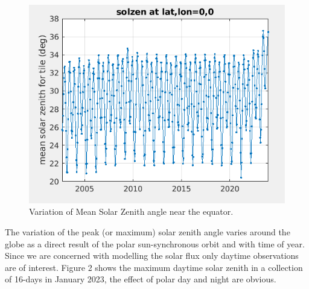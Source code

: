 \documentclass[11pt,twocolumn]{article}
\begin{document}
\begin{figure}[htbp]
\centering
\includegraphics[width=\linewidth]{./Figs/SolZenVar_2002-2023.png}
\caption{\label{fig:org25b1817}Variation of Mean Solar Zenith angle near the equator.}
\end{figure}

The variation of the peak (or maximum) solar zenith angle varies around the globe
as a direct result of the polar sun-synchronous orbit and with time of year.
Since we are concerned with modelling the solar flux only daytime observations
are of interest. Figure 2 shows the maximum daytime solar zenith in a collection of
16-days in January 2023, the effect of polar day and night are obvious.
\end{document}
